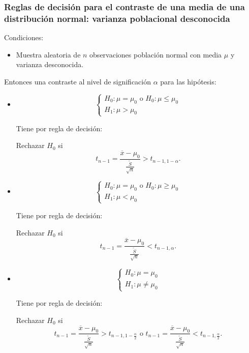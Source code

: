 \begin{frame}

\frametitle{Reglas de decisión para el contraste de una media de una distribución normal: varianza poblacional  desconocida}

Condiciones:
\begin{itemize}
        \item  Muestra aleatoria de $n$ observaciones población normal
        con media $\mu$ y varianza desconocida.
\end{itemize}
    Entonces una contraste al nivel de significación $\alpha$ para las
    hipótesis:
\begin{itemize}
\item $$\left\{\begin{array}{l}
    H_{0}:\mu=\mu_{0} \mbox{ o } H_{0}:\mu\leq \mu_{0}\\
    H_{1}:\mu>\mu_{0}
    \end{array}\right.$$


    Tiene por regla de decisión:

    Rechazar $H_{0}$ si
    $$t_{n-1}=
    \frac{\overline{x}-\mu_{0}}{\frac{\tilde{S}}{\sqrt{n}}}>t_{n-1,1-\alpha}.$$
\end{itemize}
\end{frame}

\begin{frame}
\begin{itemize}
\item   $$\left\{\begin{array}{l}
    H_{0}:\mu=\mu_{0} \mbox{ o } H_{0}:\mu\geq \mu_{0}\\
    H_{1}:\mu<\mu_{0}
    \end{array}\right.$$


    Tiene por regla de decisión:

    Rechazar $H_{0}$ si
    $$t_{n-1}=
    \frac{\overline{x}-\mu_{0}}{\frac{\tilde{S}}{\sqrt{n}}}<t_{n-1,\alpha}.$$

\item $$\left\{\begin{array}{l}
    H_{0}:\mu=\mu_{0} \\
    H_{1}:\mu\not=\mu_{0}
    \end{array}\right.$$


    Tiene por regla de decisión:

    Rechazar $H_{0}$ si  
    $$t_{n-1}=
    \frac{\overline{x}-\mu_{0}}
    {\frac{\tilde{S}}{\sqrt{n}}}>t_{n-1,1-\frac{\alpha}{2}} \mbox{ o } t_{n-1}=
    \frac{\overline{x}-\mu_{0}}
    {\frac{\tilde{S}}{\sqrt{n}}}<t_{n-1,\frac{\alpha}{2}}.$$
\end{itemize}

\end{frame}


